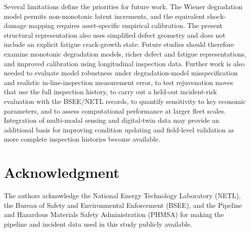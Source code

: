 \documentclass[journal]{IEEEtran}
\begin{document}
Several limitations define the priorities for future work. The Wiener
degradation model permits non-monotonic latent increments, and the
equivalent shock-damage mapping requires asset-specific empirical
calibration. The present structural representation also uses simplified
defect geometry and does not include an explicit fatigue crack-growth
state. Future studies should therefore examine monotonic degradation
models, richer defect and fatigue representations, and improved
calibration using longitudinal inspection data. Further work is also
needed to evaluate model robustness under degradation-model
misspecification and realistic in-line-inspection measurement error,
to test rejuvenation moves that use the full inspection history, to
carry out a held-out incident-risk evaluation with the BSEE/NETL
records, to quantify sensitivity to key economic parameters, and to
assess computational performance at larger fleet scales. Integration
of multi-modal sensing and
digital-twin data may provide an additional basis for improving
condition updating and field-level validation as more complete
inspection histories become available.


\section*{Acknowledgment}
The authors acknowledge the National Energy Technology Laboratory (NETL), the Bureau of Safety and Environmental Enforcement (BSEE), and the Pipeline and Hazardous Materials Safety Administration (PHMSA) for making the pipeline and incident data used in this study publicly available.
\end{document}
